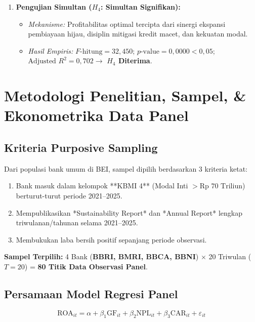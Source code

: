 \documentclass[11pt,a4paper]{article}
\begin{document}
\begin{enumerate}
    \item \textbf{Pengujian Simultan ($H_4$: Simultan Signifikan):}
    \begin{itemize}
        \item \textit{Mekanisme:} Profitabilitas optimal tercipta dari sinergi ekspansi pembiayaan hijau, disiplin mitigasi kredit macet, dan kekuatan modal.
        \item \textit{Hasil Empiris:} $F\text{-hitung} = 32{,}450$; $p\text{-value} = 0{,}0000 < 0{,}05$; $\text{Adjusted } R^2 = 0{,}702 \rightarrow$ \textbf{$H_4$ Diterima}.
    \end{itemize}
\end{enumerate}

\section{Metodologi Penelitian, Sampel, \& Ekonometrika Data Panel}

\subsection{Kriteria Purposive Sampling}
Dari populasi bank umum di BEI, sampel dipilih berdasarkan 3 kriteria ketat:
\begin{enumerate}
    \item Bank masuk dalam kelompok **KBMI 4** (Modal Inti $> \text{Rp } 70\text{ Triliun}$) berturut-turut periode 2021--2025.
    \item Mempublikasikan *Sustainability Report* dan *Annual Report* lengkap triwulanan/tahunan selama 2021--2025.
    \item Membukukan laba bersih positif sepanjang periode observasi.
\end{enumerate}
\textbf{Sampel Terpilih:} 4 Bank (\textbf{BBRI, BMRI, BBCA, BBNI}) $\times$ 20 Triwulan ($T=20$) = \textbf{80 Titik Data Observasi Panel}.

\subsection{Persamaan Model Regresi Panel}
\begin{equation}
    \text{ROA}_{it} = \alpha + \beta_1 \text{GF}_{it} + \beta_2 \text{NPL}_{it} + \beta_3 \text{CAR}_{it} + \varepsilon_{it}
\end{equation}
\end{document}
